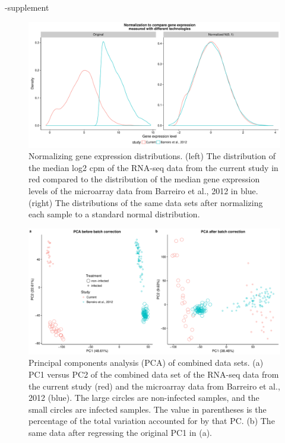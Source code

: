 \documentclass[fleqn,10pt]{wlscirep}
\begin{document}
\begin{filecontents}{\jobname-supplement}
\begin{figure}[ht]
\centering
\includegraphics[width=\linewidth]{../figure/combined-distributions.pdf}
\caption{
Normalizing gene expression distributions. (left) The distribution of
the median log2 cpm of the RNA-seq data from the current study in red
compared to the distribution of the median gene expression levels of
the microarray data from Barreiro et al., 2012 \cite{Barreiro2012} in
blue. (right) The distributions of the same data sets after
normalizing each sample to a standard normal distribution.
}
\label{fig:combined-dist}
\end{figure}

\begin{figure}[ht]
\centering
\includegraphics[width=\linewidth]{../figure/combined-pca.pdf}
\caption{
Principal components analysis (PCA) of combined data sets. (a) PC1
versus PC2 of the combined data set of the RNA-seq data from the
current study (red) and the microarray data from Barreiro et al., 2012
\cite{Barreiro2012} (blue). The large circles are non-infected
samples, and the small circles are infected samples. The value in
parentheses is the percentage of the total variation accounted for by
that PC. (b) The same data after regressing the original PC1 in (a).
}
\label{fig:combined-pca}
\end{figure}


\end{filecontents}
\end{document}
